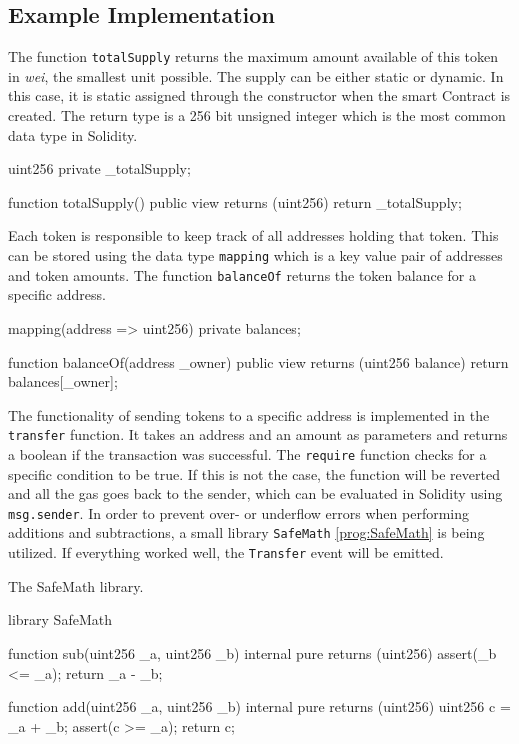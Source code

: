 \subsection{Example Implementation}
The function \texttt{totalSupply} returns the maximum amount available of this token in \textit{wei}, the smallest unit possible. The supply can be either static or dynamic. In this case, it is static assigned through the constructor when the smart Contract is created. The return type is a 256 bit unsigned integer which is the most common data type in Solidity.

\begin{GenericCode}
 uint256 private _totalSupply;
  
 function totalSupply() public view returns (uint256) {
   return _totalSupply;
 }	
\end{GenericCode}

Each token is responsible to keep track of all addresses holding that token. This can be stored using the data type \texttt{mapping} which is a key value pair of addresses and token amounts. The function \texttt{balanceOf} returns the token balance for a specific address.

\begin{GenericCode}
 mapping(address => uint256) private balances;
  
 function balanceOf(address _owner) public view returns (uint256 balance) {
   return balances[_owner];
 }
\end{GenericCode}

The functionality of sending tokens to a specific address is implemented in the \texttt{transfer} function. It takes an address and an amount as parameters and returns a boolean if the transaction was successful. The \texttt{require} function checks for a specific condition to be true. If this is not the case, the function will be reverted and all the gas goes back to the sender, which can be evaluated in Solidity using \texttt{msg.sender}. In order to prevent over- or underflow errors when performing additions and subtractions, a small library \texttt{SafeMath} \ref{prog:SafeMath} is being utilized. If everything worked well, the \texttt{Transfer} event will be emitted.

\begin{program}
\caption{The SafeMath library.}
\label{prog:SafeMath}
\begin{GenericCode}
library SafeMath {
  function sub(uint256 _a, uint256 _b) internal pure returns (uint256) {
    assert(_b <= _a);
    return _a - _b;
  }

  function add(uint256 _a, uint256 _b) internal pure returns (uint256) {
    uint256 c = _a + _b;
    assert(c >= _a);
    return c;
  }
}
\end{GenericCode}
\end{program}

